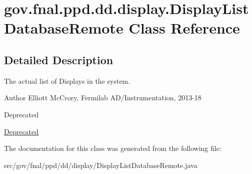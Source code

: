 \hypertarget{classgov_1_1fnal_1_1ppd_1_1dd_1_1display_1_1DisplayListDatabaseRemote}{\section{gov.\-fnal.\-ppd.\-dd.\-display.\-Display\-List\-Database\-Remote Class Reference}
\label{classgov_1_1fnal_1_1ppd_1_1dd_1_1display_1_1DisplayListDatabaseRemote}
}


\subsection{Detailed Description}
The actual list of Displays in the system.

\begin{DoxyAuthor}{Author}
Elliott Mc\-Crory, Fermilab A\-D/\-Instrumentation, 2013-\/18 
\end{DoxyAuthor}
\begin{DoxyRefDesc}{Deprecated}
\item[\hyperlink{deprecated__deprecated000003}{Deprecated}]\end{DoxyRefDesc}


The documentation for this class was generated from the following file\-:\begin{DoxyCompactItemize}
\item 
src/gov/fnal/ppd/dd/display/Display\-List\-Database\-Remote.\-java\end{DoxyCompactItemize}
